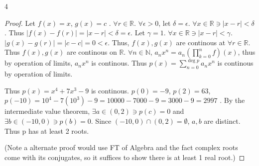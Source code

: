 \documentclass{article}
\newcommand{\R}{\mathbb{R}}
\newcommand{\N}{\mathbb{N}}
\newcommand{\abs}[1]{\left\lvert #1\right\rvert}
\begin{document}
\bigskip

\begin{PROB}{4}\label{Problem 4.}
\end{PROB}
\begin{proof}
    Let $f(x) = x$, $g(x) = c$ .  
    $\forall r \in \R$. $\forall \epsilon > 0$, let $\delta = \epsilon$. $\forall x \in \R \ni \abs{x - r} < \delta$. Thus $\abs{f(x) - f(r)} = \abs{x - r} < \delta = \epsilon$. Let $\gamma = 1$. $\forall x \in \R \ni \abs{x - r} < \gamma$. $\abs{g(x) - g(r)} = \abs{c - c} = 0 < \epsilon$.     Thus, $f(x), g(x)$ are continous at $\forall r \in \R$. Thus $f(x), g(x)$ are continous on $\R$. $\forall n \in \N$, $a_n x^n = a_n(\prod_{k = 0}^{n}f)(x)$, thus by operation of limits, $a_n x^n$ is continous. Thus $p(x) = \sum_{n = 0}^{\deg p}a_n x^n$ is continous by operation of limits. 
    
    Thus $p(x) = x^4 + 7x^3 - 9$ is continous. $p(0) = -9$, $p(2) = 63$, $p(-10) = 10^4 - 7(10^3) - 9 = 10000 - 7000 - 9 = 3000 - 9 = 2997$ .  By the intermediate value theorem, $\exists a \in (0, 2) \ni p(c) = 0$ and $\exists b \in (-10, 0) \ni p(b) = 0$. Since $(-10, 0) \cap (0, 2) = \emptyset$, $a,b$ are distinct. Thus p has at least 2 roots. 

    (Note a alternate proof would use FT of Algebra and the fact complex roots come with its conjugates, so it suffices to show there is at least 1 real root.)
\end{proof}
\end{document}
